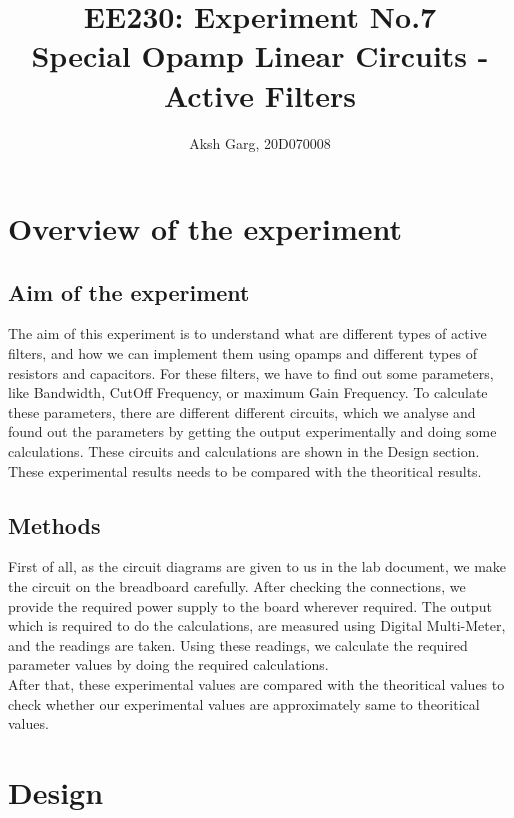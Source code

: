 \documentclass[12pt]{article}
\title{EE230: Experiment No.7\\
Special Opamp Linear Circuits - Active Filters}
\author{Aksh Garg, 20D070008}
\begin{document}
\maketitle
 

\section{Overview of the experiment} %

\subsection{Aim of the experiment}%

The aim of this experiment is to understand what are different types of active filters, and how we can implement them using opamps and different types of resistors and capacitors. For these filters, we have to find out some parameters, like Bandwidth, CutOff Frequency, or maximum Gain Frequency. To calculate these parameters, there are different different circuits, which we analyse and found out the parameters by getting the output experimentally and doing some calculations. These circuits and calculations are shown in the Design section. These experimental results needs to be compared with the theoritical results.

\subsection{Methods}
First of all, as the circuit diagrams are given to us in the lab document, we make the circuit on the breadboard carefully. After checking the connections, we provide the required power supply to the board wherever required. The output which is required to do the calculations, are measured using Digital Multi-Meter, and the readings are taken. Using these readings, we calculate the required parameter values by doing the required calculations.\\
After that, these experimental values are compared with the theoritical values to check whether our experimental values are approximately same to theoritical values.

\section{Design}%
\end{document}
